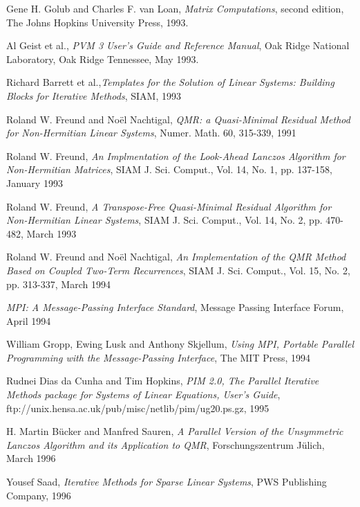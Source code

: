 \documentclass[11pt,a4paper,english,oneside]{report}
\begin{document}
\begin{thebibliography}{1}

	Gene H. Golub and Charles F. van Loan, {\em Matrix Computations},
	second edition, The Johns Hopkins University Press, 1993.

        Al Geist et al., {\em PVM 3 User's Guide and Reference Manual},
        Oak Ridge National Laboratory, Oak Ridge Tennessee, May 1993.

        Richard Barrett et al.,{\em Templates for the Solution of Linear 
        Systems: Building Blocks for Iterative Methods}, SIAM, 1993

        Roland W. Freund and No\"el Nachtigal, {\em QMR: a Quasi-Minimal
        Residual Method for Non-Hermitian Linear Systems}, Numer. Math. 
        60, 315-339, 1991

        Roland W. Freund, {\em An Implmentation of the Look-Ahead
	Lanczos Algorithm for Non-Hermitian Matrices},
        SIAM J. Sci. Comput., Vol. 14, No. 1, pp. 137-158, January 1993

        Roland W. Freund, {\em A Transpose-Free Quasi-Minimal Residual
	Algorithm for Non-Hermitian Linear Systems}, 
        SIAM J. Sci. Comput., Vol. 14, No. 2, pp. 470-482, March 1993

        Roland W. Freund and No\"el Nachtigal, {\em An Implementation of the 
        QMR Method Based on Coupled Two-Term Recurrences},
        SIAM J. Sci. Comput., Vol. 15, No. 2, pp. 313-337, March 1994

	{\em MPI: A Message-Passing Interface Standard}, Message
	Passing Interface Forum, April 1994

	William Gropp, Ewing Lusk and Anthony Skjellum, {\em Using MPI,
	Portable Parallel Programming with the Message-Passing Interface},
	The MIT Press, 1994

	Rudnei Dias da Cunha and Tim Hopkins, {\em PIM 2.0, The Parallel
	Iterative Methods package for Systems of Linear Equations, User's
	Guide}, ftp://unix.hensa.ac.uk/pub/misc/netlib/pim/ug20.ps.gz, 1995

	H. Martin B\"{u}cker and Manfred Sauren, {\em A Parallel Version
	of the Unsymmetric Lanczos Algorithm and its Application to QMR},
	Forschungszentrum J\"{u}lich, March 1996

	Yousef Saad, {\em Iterative Methods for Sparse Linear Systems},
	PWS Publishing Company, 1996


\end{thebibliography}
\end{document}
